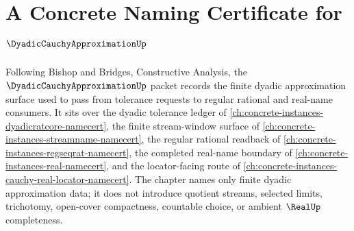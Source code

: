 \chapter{A Concrete Naming Certificate for $\DyadicCauchyApproximationUp$}
\label{ch:concrete-instances-dyadic-cauchy-approximation-namecert}

Following Bishop and Bridges, Constructive Analysis, the $\DyadicCauchyApproximationUp$ packet records the finite dyadic approximation surface used to pass from tolerance requests to regular rational and real-name consumers. It sits over the dyadic tolerance ledger of \autoref{ch:concrete-instances-dyadicratcore-namecert}, the finite stream-window surface of \autoref{ch:concrete-instances-streamname-namecert}, the regular rational readback of \autoref{ch:concrete-instances-regseqrat-namecert}, the completed real-name boundary of \autoref{ch:concrete-instances-real-namecert}, and the locator-facing route of \autoref{ch:concrete-instances-cauchy-real-locator-namecert}. The chapter names only finite dyadic approximation data; it does not introduce quotient streams, selected limits, trichotomy, open-cover compactness, countable choice, or ambient $\RealUp$ completeness.

